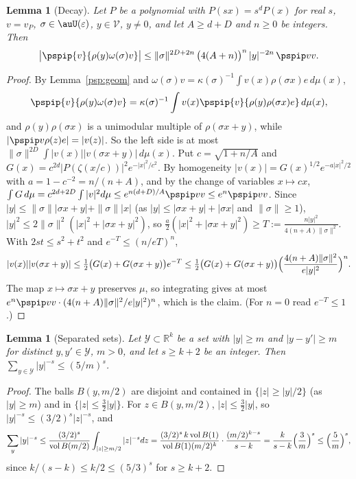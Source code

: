 \documentclass[10pt]{amsart}
\newtheorem{lemma}[theorem]{Lemma}
\theoremstyle{definition}
\theoremstyle{remark}
\newcommand{\R}{\mathbb R}
\begin{document}
\begin{lemma}[Decay]\label{psp:decay}
Let $P$ be a polynomial with $P(sx)=s^dP(x)$ for real $s$, $v=v_P$, $\sigma\in\auU(\varepsilon)$,
$y\in\mathcal V$, $y\ne0$, and let $A\ge d+D$ and $n\ge0$ be integers. Then
\[
\bigl|\pspip{v}{\rho(y)\omega(\sigma)v}\bigr|\le\|\sigma\|^{2D+2n}\,\bigl(4(A+n)\bigr)^n\,|y|^{-2n}\,
\pspip vv .
\]
\end{lemma}
\begin{proof}
By Lemma~\ref{psp:geom} and $\omega(\sigma)v=\kappa(\sigma)^{-1}\int v(x)\rho(\sigma x)e\,d\mu(x)$,
\[
\pspip{v}{\rho(y)\omega(\sigma)v}=\kappa(\sigma)^{-1}\int v(x)\pspip{v}{\rho(y)\rho(\sigma x)e}\,
d\mu(x),
\]
and $\rho(y)\rho(\sigma x)$ is a unimodular multiple of $\rho(\sigma x+y)$, while $|\pspip
v{\rho(z)e}|=|v(z)|$. So the left side is at most $\|\sigma\|^{2D}\int|v(x)||v(\sigma x+y)|\,d\mu(x)$.
Put $c=\sqrt{1+n/A}$ and $G(x)=c^{2d}|P(\zeta(x/c))|^2e^{-|x|^2/c^2}$. By homogeneity
$|v(x)|=G(x)^{1/2}e^{-a|x|^2/2}$ with $a=1-c^{-2}=n/(n+A)$, and by the change of variables $x\mapsto
cx$, $\int G\,d\mu=c^{2d+2D}\int|v|^2d\mu\le e^{n(d+D)/A}\pspip vv\le e^n\pspip vv$. Since $|y|\le
\|\sigma\||\sigma x+y|+\|\sigma\||x|$ (as $|y|\le|\sigma x+y|+|\sigma x|$ and $\|\sigma\|\ge1$),
$|y|^2\le2\|\sigma\|^2(|x|^2+|\sigma x+y|^2)$, so $\frac a2(|x|^2+|\sigma x+y|^2)\ge
T:=\frac{n|y|^2}{4(n+A)\|\sigma\|^2}$. With $2st\le s^2+t^2$ and $e^{-T}\le(n/eT)^n$,
\[
|v(x)||v(\sigma x+y)|\le\tfrac12\bigl(G(x)+G(\sigma x+y)\bigr)e^{-T}\le\tfrac12\bigl(G(x)+G(\sigma
x+y)\bigr)\Bigl(\frac{4(n+A)\|\sigma\|^2}{e|y|^2}\Bigr)^n .
\]
The map $x\mapsto\sigma x+y$ preserves $\mu$, so integrating gives at most $e^n\pspip vv\cdot
(4(n+A)\|\sigma\|^2/e|y|^2)^n$, which is the claim. (For $n=0$ read $e^{-T}\le1$.)
\end{proof}

\begin{lemma}[Separated sets]\label{psp:pack}
Let $\mathcal Y\subset\R^k$ be a set with $|y|\ge m$ and $|y-y'|\ge m$ for distinct $y,y'\in\mathcal Y$,
$m>0$, and let $s\ge k+2$ be an integer. Then $\sum_{y\in\mathcal Y}|y|^{-s}\le(5/m)^s$.
\end{lemma}
\begin{proof}
The balls $B(y,m/2)$ are disjoint and contained in $\{|z|\ge|y|/2\}$ (as $|y|\ge m$) and in
$\{|z|\le\frac32|y|\}$. For $z\in B(y,m/2)$, $|z|\le\frac32|y|$, so $|y|^{-s}\le(3/2)^s|z|^{-s}$, and
\[
\sum_y|y|^{-s}\le\frac{(3/2)^s}{\mathrm{vol}\,B(m/2)}\int_{|z|\ge m/2}|z|^{-s}dz=
\frac{(3/2)^s\,k\,\mathrm{vol}\,B(1)}{\mathrm{vol}\,B(1)(m/2)^k}\cdot\frac{(m/2)^{k-s}}{s-k}
=\frac{k}{s-k}\Bigl(\frac{3}{m}\Bigr)^s\le\Bigl(\frac5m\Bigr)^s ,
\]
since $k/(s-k)\le k/2\le(5/3)^s$ for $s\ge k+2$.
\end{proof}
\end{document}
